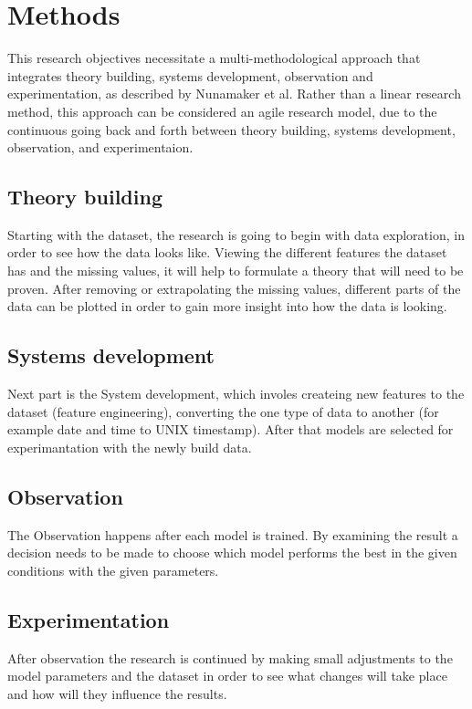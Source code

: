 \documentclass[a4paper, twocolumn]{article}
\begin{document}
\section{Methods}

This research objectives necessitate a multi-methodological approach that integrates theory building, systems development, observation and experimentation, as described by Nunamaker et al\cite{nunamaker1990systems}.
Rather than a linear research method, this approach can be considered an agile research model, due to the continuous going back and forth between theory building, systems development, observation, and experimentaion.

\subsection{Theory building}
    Starting with the dataset\cite{dataset}, the research is going to begin with data exploration,
    in order to see how the data looks like. Viewing the different features the dataset has and the missing
    values, it will help to formulate a theory that will need to be proven.
    After removing or extrapolating the missing values, different parts of the data can be plotted in order
    to gain more insight into how the data is looking.
\subsection{Systems development}
    Next part is the System development, which involes createing new features to the dataset (feature engineering),
    converting the one type of data to another (for example date and time to UNIX timestamp).
    After that models are selected for experimantation with the newly build data.
\subsection{Observation}
    The Observation happens after each model is trained. By examining the result a decision needs to be made
    to choose  which model performs the best in the given conditions with the given parameters.
\subsection{Experimentation}
    After observation the research is continued by making small adjustments to the model parameters and the dataset
    in order to see what changes will take place and how will they influence the results.
\end{document}
